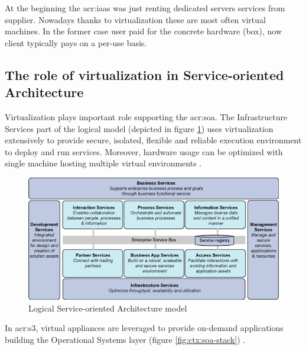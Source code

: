 \documentclass[11pt]{book}
\begin{document}
        At the beginning the \gls{acr:iaas} was just renting dedicated servers services from supplier. Nowadays thanks
        to virtualization these are most often virtual machines. In the former case user paid for the concrete hardware
        (box), now client typically pays on a per-use basis.


      \subsection{The role of virtualization in Service-oriented Architecture}


        Virtualization plays important role supporting the \gls{acr:soa}. The Infrastructure Services part of the
        logical model (depicted in figure \ref{fig:ctx:soa-logical}) uses virtualization extensively to provide secure,
        isolated, flexible and reliable execution environment to deploy and run services. Moreover, hardware usage can
        be optimized with single machine hosting multiple virtual environments \cite{soa-foundation}.

        \begin{figure}[H]
          \begin{center}
            \includegraphics[scale=.5]{img/ctx/soa-logical.png}
          \end{center}

          \caption{Logical Service-oriented Architecture model}
          \label{fig:ctx:soa-logical}
        \end{figure}


        In \gls{acr:s3}, virtual appliances are leveraged to provide on-demand applications building the Operational
        Systems layer (figure \ref{fig:ctx:soa-stack}) \cite{soa-stack}.
\end{document}
